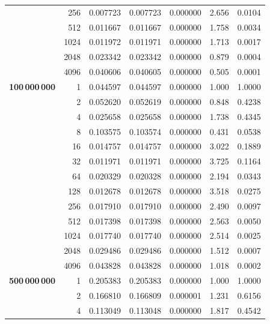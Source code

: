 \documentclass[a4paper,11pt]{article}
\begin{document}
\begin{center}
\begin{longtable}{crccccc}
                       & 256  & 0.007723 & 0.007723 & 0.000000 & 2.656  & 0.0104 \\
                       & 512  & 0.011667 & 0.011667 & 0.000000 & 1.758  & 0.0034 \\
                       & 1024 & 0.011972 & 0.011971 & 0.000000 & 1.713  & 0.0017 \\
                       & 2048 & 0.023342 & 0.023342 & 0.000000 & 0.879  & 0.0004 \\
                       & 4096 & 0.040606 & 0.040605 & 0.000000 & 0.505  & 0.0001 \\
    \midrule
    \textbf{100\,000\,000} & 1    & 0.044597 & 0.044597 & 0.000000 & 1.000  & 1.0000 \\
                       & 2    & 0.052620 & 0.052619 & 0.000000 & 0.848  & 0.4238 \\
                       & 4    & 0.025658 & 0.025658 & 0.000000 & 1.738  & 0.4345 \\
                       & 8    & 0.103575 & 0.103574 & 0.000000 & 0.431  & 0.0538 \\
                       & 16   & 0.014757 & 0.014757 & 0.000000 & 3.022  & 0.1889 \\
                       & 32   & 0.011971 & 0.011971 & 0.000000 & 3.725  & 0.1164 \\
                       & 64   & 0.020329 & 0.020328 & 0.000000 & 2.194  & 0.0343 \\
                       & 128  & 0.012678 & 0.012678 & 0.000000 & 3.518  & 0.0275 \\
                       & 256  & 0.017910 & 0.017910 & 0.000000 & 2.490  & 0.0097 \\
                       & 512  & 0.017398 & 0.017398 & 0.000000 & 2.563  & 0.0050 \\
                       & 1024 & 0.017740 & 0.017740 & 0.000000 & 2.514  & 0.0025 \\
                       & 2048 & 0.029486 & 0.029486 & 0.000000 & 1.512  & 0.0007 \\
                       & 4096 & 0.043828 & 0.043828 & 0.000000 & 1.018  & 0.0002 \\
    \midrule
    \textbf{500\,000\,000} & 1    & 0.205383 & 0.205383 & 0.000000 & 1.000  & 1.0000 \\
                       & 2    & 0.166810 & 0.166809 & 0.000001 & 1.231  & 0.6156 \\
                       & 4    & 0.113049 & 0.113048 & 0.000000 & 1.817  & 0.4542 \\

\end{longtable}
\end{center}
\end{document}
